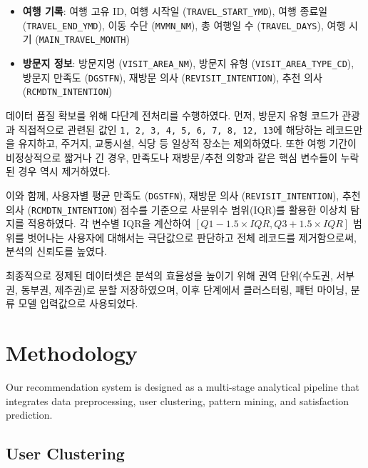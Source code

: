 \documentclass[sigconf]{acmart}
\begin{document}
\begin{CJK}{UTF8}{mj}
\begin{itemize}
  \item \textbf{여행 기록}: 여행 고유 ID, 여행 시작일 (\texttt{TRAVEL\_START\_YMD}), 여행 종료일 (\texttt{TRAVEL\_END\_YMD}), 이동 수단 (\texttt{MVMN\_NM}), 총 여행일 수 (\texttt{TRAVEL\_DAYS}), 여행 시기 (\texttt{MAIN\_TRAVEL\_MONTH})
  
  \item \textbf{방문지 정보}: 방문지명 (\texttt{VISIT\_AREA\_NM}), 방문지 유형 (\texttt{VISIT\_AREA\_TYPE\_CD}), 방문지 만족도 (\texttt{DGSTFN}), 재방문 의사 (\texttt{REVISIT\_INTENTION}), 추천 의사 (\texttt{RCMDTN\_INTENTION})
  
\end{itemize}

데이터 품질 확보를 위해 다단계 전처리를 수행하였다. 먼저, 방문지 유형 코드가 관광과 직접적으로 관련된 값인 \texttt{1, 2, 3, 4, 5, 6, 7, 8, 12, 13}에 해당하는 레코드만을 유지하고, 주거지, 교통시설, 식당 등 일상적 장소는 제외하였다. 또한 여행 기간이 비정상적으로 짧거나 긴 경우, 만족도나 재방문/추천 의향과 같은 핵심 변수들이 누락된 경우 역시 제거하였다.

이와 함께, 사용자별 평균 만족도 (\texttt{DGSTFN}), 재방문 의사 (\texttt{REVISIT\_INTENTION}), 추천 의사 (\texttt{RCMDTN\_INTENTION}) 점수를 기준으로 사분위수 범위(IQR)를 활용한 이상치 탐지를 적용하였다. 각 변수별 IQR을 계산하여 \([Q1 - 1.5 \times IQR, Q3 + 1.5 \times IQR]\) 범위를 벗어나는 사용자에 대해서는 극단값으로 판단하고 전체 레코드를 제거함으로써, 분석의 신뢰도를 높였다.

최종적으로 정제된 데이터셋은 분석의 효율성을 높이기 위해 권역 단위(수도권, 서부권, 동부권, 제주권)로 분할 저장하였으며, 이후 단계에서 클러스터링, 패턴 마이닝, 분류 모델 입력값으로 사용되었다.



\section{Methodology} %

Our recommendation system is designed as a multi-stage analytical pipeline that integrates data preprocessing, user clustering, pattern mining, and satisfaction prediction.


\subsection{User Clustering}


\end{CJK}
\end{document}

